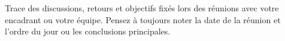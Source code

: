 Trace des discussions, retours et objectifs fixés lors des réunions avec votre encadrant ou votre équipe. Pensez à toujours noter la date de la réunion et l'ordre du jour ou les conclusions principales.
